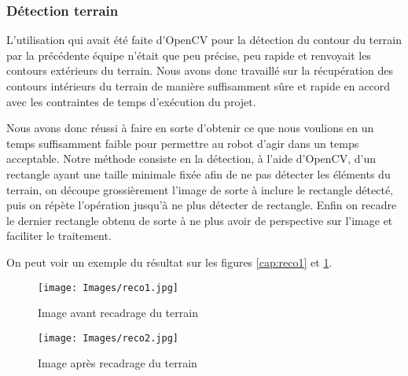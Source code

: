 \subsubsection{Détection terrain}
\label{subs:Détection terrain}
  \par L'utilisation qui avait été faite d'OpenCV pour la détection du contour du terrain par la précédente équipe n'était que peu précise, peu rapide et renvoyait les contours extérieurs du terrain.
  Nous avons donc travaillé sur la récupération des contours intérieurs du terrain de manière suffisamment sûre et rapide en accord avec les contraintes de temps d'exécution du projet.

  \par Nous avons donc réussi à faire en sorte d'obtenir ce que nous voulions en un temps suffisamment faible pour permettre au robot d'agir dans un temps acceptable.
  Notre méthode consiste en la détection, à l'aide d'OpenCV, d'un rectangle ayant une taille minimale fixée afin de ne pas détecter les éléments du terrain, on découpe grossièrement l'image de sorte à inclure le rectangle détecté, puis on répète l'opération jusqu'à ne plus détecter de rectangle.
  Enfin on recadre le dernier rectangle obtenu de sorte à ne plus avoir de perspective sur l'image et faciliter le traitement.
  \par On peut voir un exemple du résultat sur les figures \ref{cap:reco1} et \ref{cap:reco2}.
  \begin{figure}[h]
      \begin{minipage}[c]{.46\linewidth}
          \centering
          \texttt{[image: Images/reco1.jpg]}
          \caption{Image avant recadrage du terrain}
          \label{cap:reco1}
      \end{minipage}
      \hfill%
      \begin{minipage}[c]{.46\linewidth}
          \centering
          \texttt{[image: Images/reco2.jpg]}
          \caption{Image après recadrage du terrain}
          \label{cap:reco2}
      \end{minipage}
  \end{figure}
